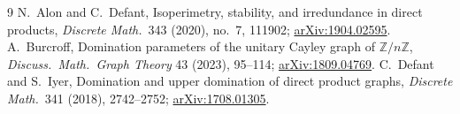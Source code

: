 \documentclass[11pt,a4paper]{article}
\theoremstyle{plain}
\theoremstyle{definition}
\theoremstyle{remark}
\begin{document}


\begin{thebibliography}{9}
\small
\setlength{\itemsep}{2pt}
 N.~Alon and C.~Defant, Isoperimetry, stability, and irredundance in direct products, \emph{Discrete Math.}\ 343 (2020), no.~7, 111902; \href{https://arxiv.org/abs/1904.02595}{arXiv:1904.02595}.
 A.~Burcroff, Domination parameters of the unitary Cayley graph of $\mathbb Z/n\mathbb Z$, \emph{Discuss.\ Math.\ Graph Theory} 43 (2023), 95--114; \href{https://arxiv.org/abs/1809.04769}{arXiv:1809.04769}.
 C.~Defant and S.~Iyer, Domination and upper domination of direct product graphs, \emph{Discrete Math.}\ 341 (2018), 2742--2752; \href{https://arxiv.org/abs/1708.01305}{arXiv:1708.01305}.
\end{thebibliography}
\end{document}
